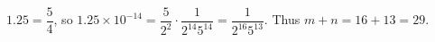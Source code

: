 $1.25=\dfrac54$, so $1.25\times10^{-14}=\dfrac{5}{2^2}\cdot\dfrac1{2^{14}5^{14}}=\dfrac1{2^{16}5^{13}}$. Thus $m+n=16+13=\boxed{29}$.
